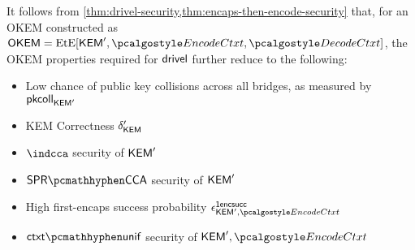 \begin{corollary}
\label{cor:drivel-security-encaps-encode}
    It follows from \cref{thm:drivel-security,thm:encaps-then-encode-security} that, for an OKEM constructed as $\OKEM = \ete[\KEM', \encodectxt, \decodectxt]$, the OKEM properties required for $\textsf{drivel}$ further reduce to the following:
    \begin{itemize}
        \item Low chance of public key collisions across all bridges, as measured by $\mathsf{pkcoll}_{\mathsf{KEM}'}$
        \item KEM Correctness $\delta_{\mathsf{KEM}}'$
        \item $\indcca$ security of $\mathsf{KEM}'$
        \item $\sprcca$ security of $\mathsf{KEM}'$
        \item High first-encaps success probability $\epsilon^\firstencapssuccess_{\KEM',\encodectxt}$
        \item $\ctxtunif$ security of $\KEM',\encodectxt$
    \end{itemize}
\end{corollary}